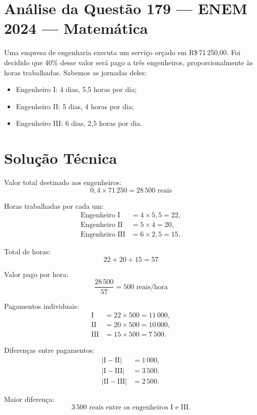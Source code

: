 \documentclass{article}
\begin{document}
\section*{Análise da Questão 179 — ENEM 2024 — Matemática}

Uma empresa de engenharia executa um serviço orçado em R\$\,71\,250,00. Foi decidido que 40\% desse valor será pago a três engenheiros, proporcionalmente às horas trabalhadas. Sabemos as jornadas deles:
\begin{itemize}
  \item Engenheiro I: 4 dias, 5,5 horas por dia;
  \item Engenheiro II: 5 dias, 4 horas por dia;
  \item Engenheiro III: 6 dias, 2,5 horas por dia.
\end{itemize}

\section{Solução Técnica}

Valor total destinado aos engenheiros:
\[
0{,}4 \times 71\,250 = 28\,500 \text{ reais}
\]

Horas trabalhadas por cada um:
\begin{align*}
\text{Engenheiro I} &= 4 \times 5{,}5 = 22,\\
\text{Engenheiro II} &= 5 \times 4 = 20,\\
\text{Engenheiro III} &= 6 \times 2{,}5 = 15.
\end{align*}

Total de horas:
\[
22 + 20 + 15 = 57
\]

Valor pago por hora:
\[
\frac{28\,500}{57} = 500 \text{ reais/hora}
\]

Pagamentos individuais:
\begin{align*}
\text{I} &= 22 \times 500 = 11\,000, \\
\text{II} &= 20 \times 500 = 10\,000, \\
\text{III} &= 15 \times 500 = 7\,500.
\end{align*}

Diferenças entre pagamentos:
\begin{align*}
|\text{I} - \text{II}| &= 1\,000, \\
|\text{I} - \text{III}| &= 3\,500, \\
|\text{II} - \text{III}| &= 2\,500.
\end{align*}

Maior diferença:
\[
3\,500 \text{ reais entre os engenheiros I e III}.
\]
\end{document}
